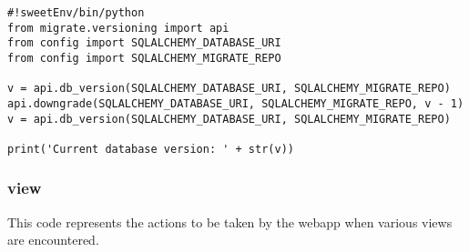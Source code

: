 \documentclass[11pt]{article}
\begin{document}
\begin{itemize}
\begin{verbatim}
#!sweetEnv/bin/python
from migrate.versioning import api
from config import SQLALCHEMY_DATABASE_URI
from config import SQLALCHEMY_MIGRATE_REPO

v = api.db_version(SQLALCHEMY_DATABASE_URI, SQLALCHEMY_MIGRATE_REPO)
api.downgrade(SQLALCHEMY_DATABASE_URI, SQLALCHEMY_MIGRATE_REPO, v - 1)
v = api.db_version(SQLALCHEMY_DATABASE_URI, SQLALCHEMY_MIGRATE_REPO)

print('Current database version: ' + str(v))
\end{verbatim}


\end{itemize} %
\subsubsection{view}
\label{sec-4-2-2}

This code represents the actions to be taken by the webapp when
various views are encountered. 
\end{document}
